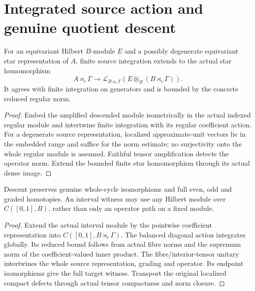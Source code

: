 \section{Integrated source action and genuine quotient descent}

\begin{proposition}\label{prop:descent-reduced-source-action}
\leanok
For an equivariant Hilbert $B$-module $E$ and a possibly degenerate
equivariant star representation of $A$, finite source integration extends to
the actual star homomorphism
\[
 A\rtimes_r\Gamma\longrightarrow
 \mathcal L_{B\rtimes_r\Gamma}(E\otimes_B(B\rtimes_r\Gamma)).
\]
It agrees with finite integration on generators and is bounded by the concrete
reduced regular norm.
\end{proposition}
\begin{proof}
\leanok
Embed the amplified descended module isometrically in the actual indexed
regular module and intertwine finite integration with its regular coefficient
action. For a degenerate source representation, localized approximate-unit
vectors lie in the embedded range and suffice for the norm estimate; no
surjectivity onto the whole regular module is assumed. Faithful tensor
amplification detects the operator norm. Extend the bounded finite star
homomorphism through its actual dense image.
\end{proof}


\begin{proposition}\label{prop:descent-full-homotopy}
\leanok
Descent preserves genuine whole-cycle isomorphisms and full even, odd and
graded homotopies. An interval witness may use any Hilbert module over
$C([0,1],B)$, rather than only an operator path on a fixed module.
\end{proposition}
\begin{proof}
\leanok
Extend the actual interval module by the pointwise coefficient
representation into $C([0,1],B\rtimes_r\Gamma)$. The balanced diagonal
action integrates globally. Its reduced bound follows from actual fibre
norms and the supremum norm of the coefficient-valued inner product.
The fibre/interior-tensor unitary intertwines the whole source representation,
grading and operator. Its endpoint isomorphisms give the full target witness.
Transport the original localized compact defects through actual tensor
compactness and norm closure.
\end{proof}


